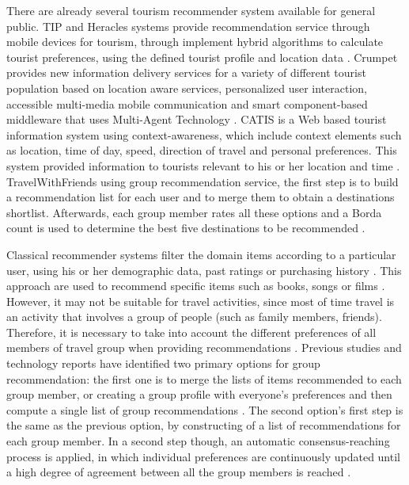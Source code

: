 There are already several tourism recommender system available for general public. TIP and Heracles systems provide recommendation service through mobile devices for tourism, through implement hybrid algorithms to calculate tourist preferences, using the defined tourist profile and location data \cite{morenorecommender}. Crumpet provides new information delivery services for a variety of different tourist population based on location aware services, personalized user interaction, accessible multi-media mobile communication and smart component-based middleware that uses Multi-Agent Technology \cite{Santos2018}. CATIS is a Web based tourist information system using context-awareness, which include context elements such as location, time of day, speed, direction of travel and personal preferences. This system provided information to tourists relevant to his or her location and time \cite{Santos2018}. TravelWithFriends using group recommendation service, the first step is to build a recommendation list for each user and to merge them to obtain a destinations shortlist. Afterwards, each group member rates all these options and a Borda count is used to determine the best five destinations to be recommended \cite{morenorecommender}.

Classical recommender systems filter the domain items according to a particular user, using his or her demographic data, past ratings or purchasing history \cite{LU201512}. This approach are used to recommend specific items such as books, songs or films \cite{LU201512}. However, it may not be suitable for travel activities, since most of time travel is an activity that involves a group of people (such as family members, friends). Therefore, it is necessary to take into account the different preferences of all members of travel group when providing recommendations \cite{morenorecommender}. Previous studies and technology reports have identified two primary options for group recommendation: the first one is to merge the lists of items recommended to each group member, or creating a group profile with everyone’s preferences and then compute a single list of group recommendations \cite{Garcia2009}. The second option’s first step is the same as the previous option, by constructing of a list of recommendations for each group member. In a second step though, an automatic consensus-reaching process is applied, in which individual preferences are continuously updated until a high degree of agreement between all the group members is reached \cite{Garcia2009}.

